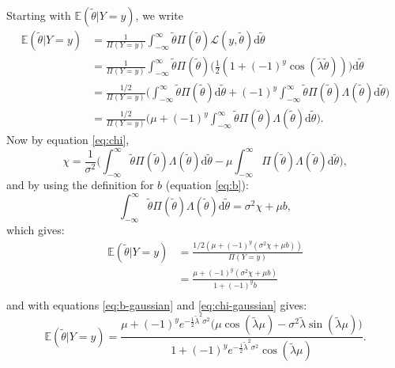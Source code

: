 \documentclass[]{report}
\begin{document}
Starting with $\mathbb{E}(\tilde{\theta} | Y=y)$, we write
\begin{align}
    \mathbb{E}(\tilde{\theta} | Y=y) &= \frac{1}{\Pi(Y=y)} \int_{-\infty}^{\infty} \tilde{\theta} \Pi(\tilde{\theta})\mathcal{L}(y, \tilde{\theta})\text{d}\tilde{\theta}\\
    &= \frac{1}{\Pi(Y=y)} \int_{-\infty}^{\infty} \tilde{\theta} \Pi(\tilde{\theta})\Big(\frac{1}{2}(1 + (-1)^{y} \cos(\tilde{\lambda} \tilde{\theta}))\Big)\text{d}\tilde{\theta}\\
    &= \frac{1/2}{\Pi(Y=y)} \Bigg(\int_{-\infty}^{\infty}\tilde{\theta}\Pi(\tilde{\theta})\text{d}\tilde{\theta} + (-1)^y \int_{-\infty}^{\infty}\tilde{\theta}\Pi(\tilde{\theta})\Lambda(\tilde{\theta})\text{d}\tilde{\theta}\Bigg)\\
    &= \frac{1/2}{\Pi(Y=y)} \Bigg(\mu + (-1)^y \int_{-\infty}^{\infty}\tilde{\theta}\Pi(\tilde{\theta})\Lambda(\tilde{\theta})\text{d}\tilde{\theta}\Bigg).
\end{align}
Now by equation \eqref{eq:chi},
\begin{equation}
    \chi = \frac{1}{\sigma^2}\Bigg( \int_{-\infty}^{\infty} \tilde{\theta}\Pi(\tilde{\theta})\Lambda(\tilde{\theta})\text{d}\tilde{\theta} - \mu \int_{-\infty}^{\infty} \Pi(\tilde{\theta})\Lambda(\tilde{\theta})\text{d}\tilde{\theta}\Bigg),
\end{equation}
and by using the definition for $b$ (equation \eqref{eq:b}):
\begin{equation}
    \int_{-\infty}^{\infty} \tilde{\theta}\Pi(\tilde{\theta})\Lambda(\tilde{\theta})\text{d}\tilde{\theta} = \sigma^2\chi + \mu b,
\end{equation}
which gives:
\begin{align}
    \mathbb{E}(\tilde{\theta} | Y=y) &= \frac{1/2(\mu + (-1)^y(\sigma^2\chi + \mu b))}{\Pi(Y=y)}\\
    &= \frac{\mu + (-1)^y(\sigma^2\chi + \mu b)}{1+(-1)^yb}\\
\end{align}
and with equations \eqref{eq:b-gaussian} and \eqref{eq:chi-gaussian} gives:
\begin{equation}
    \mathbb{E}(\tilde{\theta} | Y=y) = \frac{\mu + (-1)^ye^{-\frac{1}{2}\tilde{\lambda}^2\sigma^2}\big(\mu\cos(\tilde{\lambda}\mu) - \sigma^2\tilde{\lambda} \sin(\tilde{\lambda}\mu)\big)}{1+(-1)^ye^{-\frac{1}{2}\tilde{\lambda}^2\sigma^2}\cos(\tilde{\lambda}\mu)}.
\end{equation}
\end{document}
